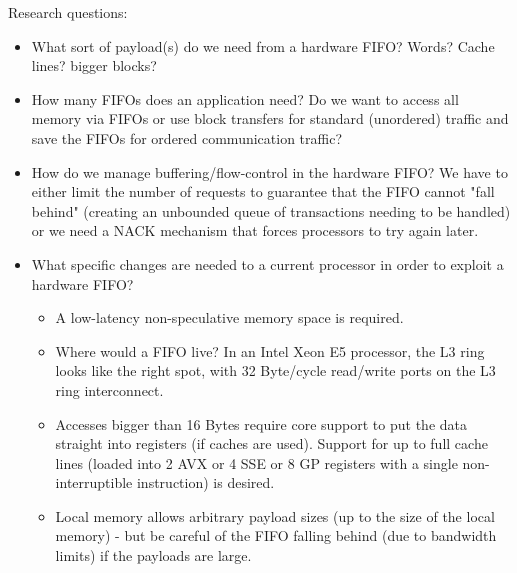      Research questions:  
     \begin{itemize}
       \item What sort of payload(s) do we need from a hardware FIFO?  Words? Cache lines? bigger blocks?
       \item How many FIFOs does an application need?  Do we want to access all memory via FIFOs or use block transfers for standard (unordered) traffic and save the FIFOs for ordered communication traffic?
       \item How do we manage buffering/flow-control in the hardware
         FIFO?  We have to either limit the number of requests to
         guarantee that the FIFO cannot "fall behind" (creating an
         unbounded queue of transactions needing to be handled) or we
         need a NACK mechanism that forces processors to try again
         later.
      \item What specific changes are needed to a current processor in order to exploit a hardware FIFO? 
      \begin{itemize}
        \item A low-latency non-speculative memory space is required.
        \item Where would a FIFO live?  In an Intel Xeon E5 processor, the L3 ring looks like the right spot, with 32 Byte/cycle read/write ports on the L3 ring interconnect.
        \item Accesses bigger than 16 Bytes require core support to
          put the data straight into registers (if caches are used).
          Support for up to full cache lines (loaded into 2 AVX or 4
          SSE or 8 GP registers with a single non-interruptible
          instruction) is desired.
        \item Local memory allows arbitrary payload sizes (up to the size of the local memory) - but be careful of the FIFO falling behind (due to bandwidth limits) if the payloads are large.
      \end{itemize}
    \end{itemize}

